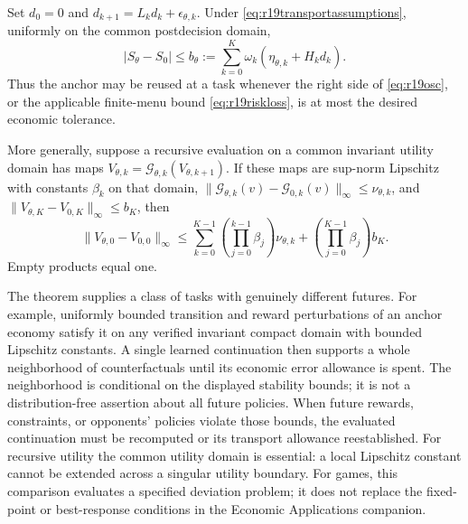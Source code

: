 \begin{theorem}
\label{thm:r19transport}
Set $d_0=0$ and
$d_{k+1}=L_kd_k+\epsilon_{\theta,k}$. Under
\eqref{eq:r19transportassumptions}, uniformly on the common postdecision
domain,
\begin{equation}
 |S_\theta-S_0|\leq
 b_\theta:=\sum_{k=0}^{K}\omega_k
                   (\eta_{\theta,k}+H_kd_k).
 \label{eq:r19transport}
\end{equation}
Thus the anchor may be reused at a task whenever the right side of
\eqref{eq:r19osc}, or the applicable finite-menu bound
\eqref{eq:r19riskloss}, is at most the desired economic tolerance.

More generally, suppose a recursive evaluation on a common invariant utility
domain has maps $V_{\theta,k}=\mathcal G_{\theta,k}(V_{\theta,k+1})$.
If these maps are sup-norm Lipschitz with constants $\beta_k$ on that domain,
$\|\mathcal G_{\theta,k}(v)-\mathcal G_{0,k}(v)\|_\infty\leq\nu_{\theta,k}$,
and $\|V_{\theta,K}-V_{0,K}\|_\infty\leq b_K$, then
\begin{equation}
 \|V_{\theta,0}-V_{0,0}\|_\infty\leq
 \sum_{k=0}^{K-1}\left(\prod_{j=0}^{k-1}\beta_j\right)\nu_{\theta,k}
       +\left(\prod_{j=0}^{K-1}\beta_j\right)b_K.
 \label{eq:r19recursive}
\end{equation}
Empty products equal one.
\end{theorem}

The theorem supplies a class of tasks with genuinely different futures.
For example, uniformly bounded transition and reward perturbations of an
anchor economy satisfy it on any verified invariant compact domain with
bounded Lipschitz constants. A single learned continuation then supports a
whole neighborhood of counterfactuals until its economic error allowance is
spent. The neighborhood is conditional on the displayed stability bounds;
it is not a distribution-free assertion about all future policies. When
future rewards, constraints, or opponents' policies violate those bounds,
the evaluated continuation must be recomputed or its transport allowance
reestablished. For recursive utility the common utility domain is essential:
a local Lipschitz constant cannot be extended across a singular utility
boundary. For games, this comparison evaluates a specified deviation problem;
it does not replace the fixed-point or best-response conditions in the
Economic Applications companion.

